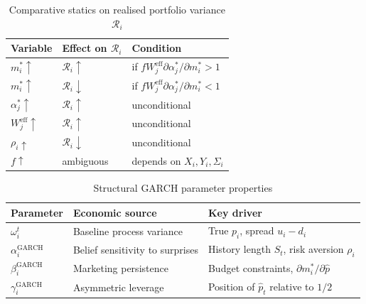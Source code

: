 \documentclass[12pt,a4paper]{article}
\newcommand{\1}{\mathbf{1}}
\begin{document}
\begin{table}[H]
  \centering
  \caption{Comparative statics on realised portfolio variance $\mathcal{R}_i$}
  \begin{tabular}{@{} l l l @{}}
    \toprule
    Variable & Effect on $\mathcal{R}_i$ & Condition \\
    \midrule
    $m_i^* \uparrow$ & $\mathcal{R}_i \uparrow$ & if $fW_j^{\mathrm{eff}}\partial\alpha_j^*/\partial m_i^* > 1$ \\
    $m_i^* \uparrow$ & $\mathcal{R}_i \downarrow$ & if $fW_j^{\mathrm{eff}}\partial\alpha_j^*/\partial m_i^* < 1$ \\
    $\alpha_j^* \uparrow$ & $\mathcal{R}_i \uparrow$ & unconditional \\
    $W_j^{\mathrm{eff}} \uparrow$ & $\mathcal{R}_i \uparrow$ & unconditional \\
    $\rho_i \uparrow$ & $\mathcal{R}_i \downarrow$ & unconditional \\
    $f \uparrow$ & ambiguous & depends on $X_i, Y_i, \Sigma_i$ \\
    \bottomrule
  \end{tabular}
\end{table}

\begin{table}[H]
  \centering
  \caption{Structural GARCH parameter properties}
  \begin{tabular}{@{} l l l @{}}
    \toprule
    Parameter & Economic source & Key driver \\
    \midrule
    $\omega_i^t$ & Baseline process variance & True $p_i$, spread $u_i-d_i$ \\
    $\alpha_i^{\mathrm{GARCH}}$ & Belief sensitivity to surprises & History length $S_t$, risk aversion $\rho_i$ \\
    $\beta_i^{\mathrm{GARCH}}$ & Marketing persistence & Budget constraints, $\partial m_i^*/\partial\hat{p}$ \\
    $\gamma_i^{\mathrm{GARCH}}$ & Asymmetric leverage & Position of $\hat{p}_t$ relative to $1/2$ \\
    \bottomrule
  \end{tabular}
\end{table}
\end{document}
